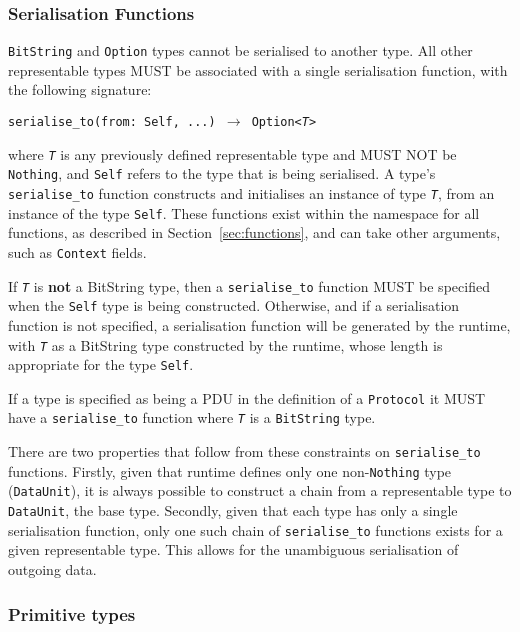 \documentclass[10pt,twocolumn,a4paper]{article}
\newcommand{\code}[1]{\texttt{#1}}
\begin{document}
\subsubsection{Serialisation Functions}
\label{sec:representable-serialise}

\code{BitString} and \code{Option} types cannot be serialised to another
type. All other representable types MUST be associated with a single serialisation
function, with the following signature:

\begin{center}
  \texttt{serialise\_to(from: Self, ...) $\rightarrow$ Option<\emph{T}>}
\end{center}

where \code{\emph{T}} is any previously defined representable type and MUST NOT
be \code{Nothing}, and \code{Self} refers to the type that is being serialised.
A type's \code{serialise\_to} function constructs and initialises an instance of
type \code{\emph{T}}, from an instance of the type \code{Self}. These functions exist within
the namespace for all functions, as described in Section~\ref{sec:functions}, and
can take other arguments, such as \code{Context} fields.

If \code{\emph{T}} is \textbf{not} a BitString type, then a \code{serialise\_to} function
MUST be specified when the \code{Self} type is being constructed. Otherwise, and
if a serialisation function is not specified,
a serialisation function will be generated by the runtime, with
\code{\emph{T}} as a BitString type constructed by the runtime, whose length is
appropriate for the type \code{Self}.

If a type is specified as being a PDU in the definition of a \code{Protocol} it
MUST have a \code{serialise\_to} function where \code{\emph{T}} is a \code{BitString}
type.

There are two properties that follow from these constraints on \code{serialise\_to}
functions. Firstly, given that runtime defines only one non-\code{Nothing} type
(\code{DataUnit}), it is always possible to construct a chain from a representable type
to \code{DataUnit}, the base type. Secondly, given that each type has only a single
serialisation function, only one such chain of \code{serialise\_to} functions exists for
a given representable type. This allows for the unambiguous serialisation of outgoing
data.

\subsubsection{Primitive types}
\label{sec:representable-primitive}
\end{document}
